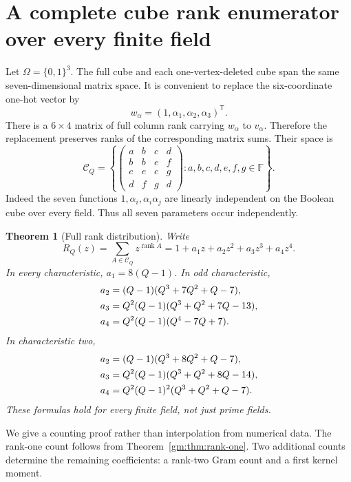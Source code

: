 \documentclass[11pt,a4paper]{article}
\numberwithin{equation}{section}
\newtheorem{theorem}{Theorem}[section]
\theoremstyle{definition}
\theoremstyle{remark}
\newcommand{\F}{\mathbb F}
\newcommand{\1}{\mathbf 1}
\newcommand{\rank}{\operatorname{rank}}
\begin{document}
\section{A complete cube rank enumerator over every finite field}
\label{gm:sec:enumerator}

Let $\Omega=\{0,1\}^3$. The full cube and each one-vertex-deleted cube
span the same seven-dimensional matrix space. It is convenient to replace
the six-coordinate one-hot vector by
\[
 w_\alpha=(1,\alpha_1,\alpha_2,\alpha_3)^{\mathsf T}.
\]
There is a $6\times4$ matrix of full column rank carrying $w_\alpha$ to
$v_\alpha$. Therefore the replacement preserves ranks of the corresponding
matrix sums. Their space is
\begin{equation}\label{gm:eq:cube-space}
 \mathcal C_Q=
 \left\{
 \begin{pmatrix}
 a&b&c&d\\ b&b&e&f\\ c&e&c&g\\ d&f&g&d
 \end{pmatrix}: a,b,c,d,e,f,g\in\F
 \right\}.
\end{equation}
Indeed the seven functions $1,\alpha_i,\alpha_i\alpha_j$ are linearly
independent on the Boolean cube over every field. Thus all seven
parameters occur independently.

\begin{theorem}[Full rank distribution]\label{gm:thm:cube-enumerator}
Write
\[
 R_Q(z)=\sum_{A\in\mathcal C_Q}z^{\rank A}
        =1+a_1z+a_2z^2+a_3z^3+a_4z^4.
\]
In every characteristic, $a_1=8(Q-1)$. In odd characteristic,
\begin{align}
 a_2&=(Q-1)(Q^3+7Q^2+Q-7),\notag\\
 a_3&=Q^2(Q-1)(Q^3+Q^2+7Q-13),\label{gm:eq:odd-enumerator}\\
 a_4&=Q^2(Q-1)(Q^4-7Q+7).\notag
\end{align}
In characteristic two,
\begin{align}
 a_2&=(Q-1)(Q^3+8Q^2+Q-7),\notag\\
 a_3&=Q^2(Q-1)(Q^3+Q^2+8Q-14),\label{gm:eq:even-enumerator}\\
 a_4&=Q^2(Q-1)^2(Q^3+Q^2+Q-7).\notag
\end{align}
These formulas hold for every finite field, not just prime fields.
\end{theorem}

We give a counting proof rather than interpolation from numerical data.
The rank-one count follows from Theorem~\ref{gm:thm:rank-one}. Two
additional counts determine the remaining coefficients: a rank-two Gram
count and a first kernel moment.
\end{document}
